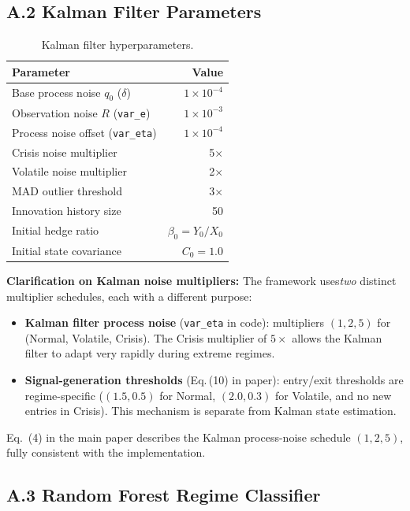 \documentclass[conference]{IEEEtran}
\begin{document}
\subsection{A.2 Kalman Filter Parameters}

\begin{table}[h]
\centering
\caption{Kalman filter hyperparameters.}
\label{tab:supp_kalman}
\small
\begin{tabular}{lr}
\toprule
Parameter & Value \\
\midrule
Base process noise $q_0$ ($\delta$) & $1 \times 10^{-4}$ \\
Observation noise $R$ (\texttt{var\_e}) & $1 \times 10^{-3}$ \\
Process noise offset (\texttt{var\_eta}) & $1 \times 10^{-4}$ \\
Crisis noise multiplier & 5$\times$ \\
Volatile noise multiplier & 2$\times$ \\
MAD outlier threshold & 3$\times$ \\
Innovation history size & 50 \\
Initial hedge ratio & $\beta_0 = Y_0 / X_0$ \\
Initial state covariance & $C_0 = 1.0$ \\
\bottomrule
\end{tabular}
\end{table}

\textbf{Clarification on Kalman noise multipliers:} The framework uses\emph{two} distinct multiplier schedules, each with a different purpose:
\begin{itemize}
  \item \textbf{Kalman filter process noise} (\texttt{var\_eta} in code): multipliers $(1, 2, 5)$ for (Normal, Volatile, Crisis). The Crisis multiplier of $5\times$ allows the Kalman filter to adapt very rapidly during extreme regimes.
    \item \textbf{Signal-generation thresholds} (Eq.\,(10) in paper): entry/exit thresholds are regime-specific 
    ($(1.5,0.5)$ for Normal, $(2.0,0.3)$ for Volatile, and no new entries in Crisis). This mechanism is separate from Kalman state estimation.
\end{itemize}
Eq.~(4) in the main paper describes the Kalman process-noise schedule $(1,2,5)$, fully consistent with the implementation.

\subsection{A.3 Random Forest Regime Classifier}
\end{document}

